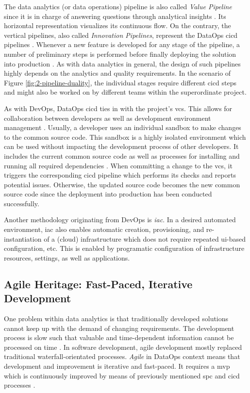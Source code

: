 The data analytics (or data operations) pipeline is also called \textit{Value Pipeline} since it is in charge of answering questions through analytical insights \cite[32\psq]{Bergh2019}. Its horizontal representation visualizes its continuous flow. On the contrary, the vertical pipelines, also called \textit{Innovation Pipelines}, represent the DataOps \ac{cicd} pipelines \cite[66]{Schmidt2019}. Whenever a new feature is developed for any stage of the pipeline, a number of preliminary steps is performed before finally deploying the solution into production \cite[33]{Bergh2019}. As with data analytics in general, the design of such pipelines highly depends on the analytics and quality requirements. In the scenario of Figure \ref{fig:2-pipeline-duality}, the individual stages require different \ac{cicd} steps and might also be worked on by different teams within the superordinate project.

As with DevOps, DataOps \ac{cicd} ties in with the project's \acf{vcs}. This allows for collaboration between developers as well as development environment management \cite{Davis2020}. Usually, a developer uses an individual sandbox to make changes to the common source code. This sandbox is a highly isolated environment which can be used without impacting the development process of other developers. It includes the current common source code as well as processes for installing and running all required dependencies \cite[41]{Bergh2019}. When committing a change to the \ac{vcs}, it triggers the corresponding \ac{cicd} pipeline which performs its checks and reports potential issues. Otherwise, the updated source code becomes the new common source code since the deployment into production has been conducted successfully.

Another methodology originating from DevOps is \textit{\ac{iac}}. In a desired automated environment, \ac{iac} also enables automatic creation, provisioning, and re-instantiation of a (cloud) infrastructure \cite[8\psqq]{Chaganti2018} which does not require repeated \acs{ui}-based configuration, etc. This is enabled by programatic configuration of infrastructure resources, settings, as well as applications.

\subsection{Agile Heritage: Fast-Paced, Iterative Development}
One problem within data analytics is that traditionally developed solutions cannot keep up with the demand of changing requirements. The development process is slow such that valuable and time-dependent information cannot be processed on time \cite{Lockner2019}. In software development, agile development mostly replaced traditional waterfall-orientated processes. \textit{Agile} in DataOps context means that development and improvement is iterative and fast-paced. It requires a \ac{mvp} which is continuously improved by means of previously mentioned \ac{spc} and \ac{cicd} processes \cite[19\psq]{Bergh2019}.
